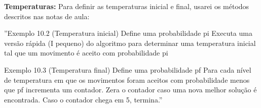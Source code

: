 \documentclass[14pt]{extarticle}
\begin{document}
\textbf{Temperaturas:} Para definir as temperaturas inicial e final, usarei os métodos descritos nas notas de aula:

''Exemplo 10.2 (Temperatura inicial)
Define uma probabilidade pi
Executa uma versão rápida (I pequeno) do algoritmo
para determinar uma temperatura inicial tal que um movimento é aceito
com probabilidade pi

Exemplo 10.3 (Temperatura final)
Define uma probabilidade pf
Para cada nível de temperatura em que os movimentos
foram aceitos com probabilidade menos que pf
incrementa um contador.
Zera o contador caso uma nova melhor solução é encontrada. Caso o contador
chega em 5, termina.''
\end{document}

